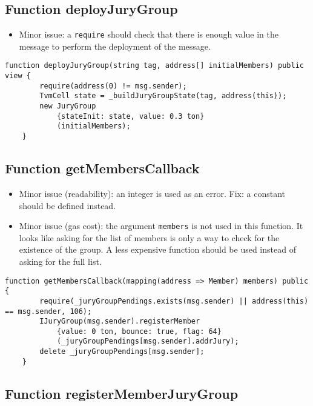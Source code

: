 \subsection{Function deployJuryGroup}

\begin{itemize}
\item Minor issue: a {\tt require} should check that there is enough
  value in the message to perform the deployment of the message.
\end{itemize}

\begin{lstlisting}[firstnumber=112]
    function deployJuryGroup(string tag, address[] initialMembers) public view {
        require(address(0) != msg.sender);
        TvmCell state = _buildJuryGroupState(tag, address(this));
        new JuryGroup
            {stateInit: state, value: 0.3 ton}
            (initialMembers);
    }
\end{lstlisting}

\subsection{Function getMembersCallback}

\begin{itemize}
\item Minor issue (readability): an integer is used as an error. Fix:
  a constant should be defined instead.
\item Minor issue (gas cost): the argument {\tt members} is not used
  in this function. It looks like asking for the list of members is
  only a way to check for the existence of the group. A less expensive
  function should be used instead of asking for the full list.
\end{itemize}

\begin{lstlisting}[firstnumber=130]
    function getMembersCallback(mapping(address => Member) members) public {
        require(_juryGroupPendings.exists(msg.sender) || address(this) == msg.sender, 106);
        IJuryGroup(msg.sender).registerMember
            {value: 0 ton, bounce: true, flag: 64}
            (_juryGroupPendings[msg.sender].addrJury);
        delete _juryGroupPendings[msg.sender];
    }
\end{lstlisting}

\subsection{Function registerMemberJuryGroup}

